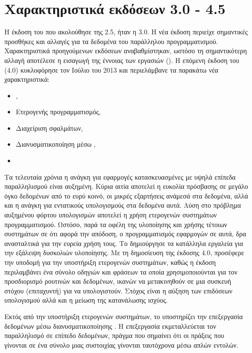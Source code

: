 \clearpage
\section{Χαρακτηριστικά εκδόσεων  3.0 - 4.5}
Η έκδοση του \emph{} που ακολούθησε της 2.5, ήταν η 3.0. Η νέα έκδοση περιείχε σημαντικές προσθήκες και
αλλαγές για τα δεδομένα του παράλληλου προγραμματισμού. Χαρακτηριστικά προηγούμενων εκδόσεων αναβαθμίστηκαν, ωστόσο τη
σημαντικότερη αλλαγή αποτέλεσε η εισαγωγή της έννοιας των εργασιών (\textbf{}). Η επόμενη έκδοση του
\emph{} (4.0) κυκλοφόρησε τον Ιούλιο του 2013 και περιελάμβανε τα παρακάτω νέα χαρακτηριστικά:

\begin{itemize}
    \item \emph{},
    \item Ετερογενής προγραμματισμός,
    \item Διαχείριση σφαλμάτων,
    \item Διανυσματικοποίηση μέσω \emph{},
    \item \emph{}
\end{itemize}

Τα τελευταία χρόνια η ανάγκη για εφαρμογές κατασκευασμένες με υψηλά επίπεδα παραλληλισμού είναι αυξημένη. Κύρια αιτία
αποτελεί η ευκολία πρόσβασης σε μεγάλο όγκο δεδομένων από το ευρύ κοινό, οι μικρές εξαρτήσεις ανάμεσά στα δεδομένα, αλλά
και η ανάγκη για εντατικούς υπολογισμούς στα δεδομένα αυτά. Λύση στο πρόβλημα αυξημένου φόρτου υπολογισμών αποτελεί η
χρήση ετερογενών συστημάτων προγραμματισμού. Ωστόσο, παρά τα οφέλη της υλοποίησης και χρήσης τέτοιων συστημάτων σε ότι
αφορά την απόδοση, ο προγραμματισμός εφαρμογών σε αυτά, δρα ανασταλτικά για την ευρεία χρήση τους. Το \emph{}
δημιούργησε τα κατάλληλα εργαλεία για την εξάλειψη δυσκολιών υλοποίησης. Με τη δημοσίευση της έκδοσης 4.0, προσέφερε την
υποδομή για την υποστήριξη ετερογενών συστημάτων, καθώς η έκδοση περιλαμβάνει ένα σύνολο οδηγιών και φράσεων τα οποία
χρησιμοποιούνται για τον προσδιορισμό ρουτινών και δεδομένων, ικανών να μετακινηθούν σε μια συσκευή στόχου
(επιταχυντή) για να υπολογιστούν. Στόχος είναι η αύξηση των επιδόσεων υπολογισμού αλλά και η μείωση της κατανάλωσης
ισχύος. 

Εκτός από την υποστήριξη ετερογενών συστημάτων, το \emph{} υποστηρίζει την επεξεργασία δεδομένων μέσω
διανυσματικοποίησης \emph{}. Η επεξεργασία \emph{} εκμεταλλεύεται
τον παραλληλισμό σε επίπεδο δεδομένων, πράγμα που σημαίνει ότι οι πράξεις που γίνονται σε ένα σύνολο μιας συστοιχίας γίνονται ταυτόχρονα μέσω απλών εντολών.

